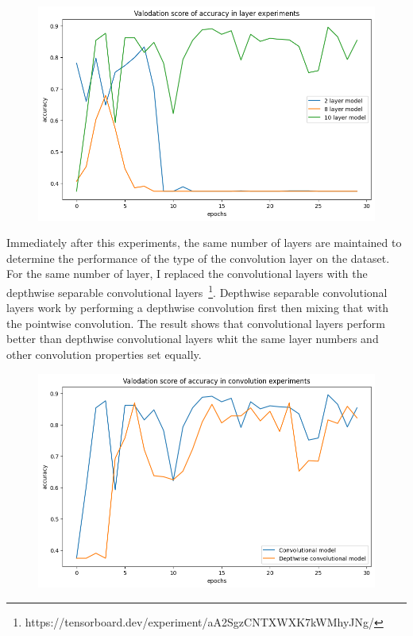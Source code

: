 \begin{figure}[H]
    \centering
    \includegraphics[width=\textwidth]{img/layerexpaccuracy.png}
    \caption{}
    \label{fig:layerexpacc}
\end{figure}

Immediately after this experiments, the same number of layers are maintained to determine the performance of the type of the convolution layer on the dataset.
For the same number of layer, I replaced the convolutional layers with the depthwise separable convolutional layers~\footnote{https://tensorboard.dev/experiment/aA2SgzCNTXWXK7kWMhyJNg/}.
Depthwise separable convolutional layers work by performing a depthwise convolution first then mixing that with the pointwise convolution.
The result shows that convolutional layers perform better than depthwise convolutional layers whit the same layer numbers and other convolution properties set equally.

\begin{figure}[H]
    \centering
    \includegraphics[width=.8\textwidth]{img/deptoconvexpaccuracy.png}
    \caption{}
    \label{fig:depttoconvacc}
\end{figure}

